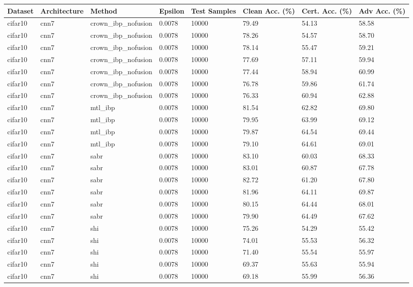 \begin{tabular}{llllllll}\toprule
Dataset & Architecture & Method & Epsilon & Test Samples & Clean Acc. (\%) & Cert. Acc. (\%) & Adv Acc. (\%) \\\midrule
cifar10 & cnn7 & crown\_ibp\_nofusion & 0.0078 & 10000 & 79.49 & 54.13 & 58.58 \\
cifar10 & cnn7 & crown\_ibp\_nofusion & 0.0078 & 10000 & 78.26 & 54.57 & 58.70 \\
cifar10 & cnn7 & crown\_ibp\_nofusion & 0.0078 & 10000 & 78.14 & 55.47 & 59.21 \\
cifar10 & cnn7 & crown\_ibp\_nofusion & 0.0078 & 10000 & 77.69 & 57.11 & 59.94 \\
cifar10 & cnn7 & crown\_ibp\_nofusion & 0.0078 & 10000 & 77.44 & 58.94 & 60.99 \\
cifar10 & cnn7 & crown\_ibp\_nofusion & 0.0078 & 10000 & 76.78 & 59.86 & 61.74 \\
cifar10 & cnn7 & crown\_ibp\_nofusion & 0.0078 & 10000 & 76.33 & 60.94 & 62.88 \\
cifar10 & cnn7 & mtl\_ibp & 0.0078 & 10000 & 81.54 & 62.82 & 69.80 \\
cifar10 & cnn7 & mtl\_ibp & 0.0078 & 10000 & 79.95 & 63.99 & 69.12 \\
cifar10 & cnn7 & mtl\_ibp & 0.0078 & 10000 & 79.87 & 64.54 & 69.44 \\
cifar10 & cnn7 & mtl\_ibp & 0.0078 & 10000 & 79.10 & 64.61 & 69.01 \\
cifar10 & cnn7 & sabr & 0.0078 & 10000 & 83.10 & 60.03 & 68.33 \\
cifar10 & cnn7 & sabr & 0.0078 & 10000 & 83.01 & 60.87 & 67.78 \\
cifar10 & cnn7 & sabr & 0.0078 & 10000 & 82.72 & 61.20 & 67.80 \\
cifar10 & cnn7 & sabr & 0.0078 & 10000 & 81.96 & 64.11 & 69.87 \\
cifar10 & cnn7 & sabr & 0.0078 & 10000 & 80.15 & 64.44 & 68.01 \\
cifar10 & cnn7 & sabr & 0.0078 & 10000 & 79.90 & 64.49 & 67.62 \\
cifar10 & cnn7 & shi & 0.0078 & 10000 & 75.26 & 54.29 & 55.42 \\
cifar10 & cnn7 & shi & 0.0078 & 10000 & 74.01 & 55.53 & 56.32 \\
cifar10 & cnn7 & shi & 0.0078 & 10000 & 71.40 & 55.54 & 55.97 \\
cifar10 & cnn7 & shi & 0.0078 & 10000 & 69.37 & 55.63 & 55.94 \\
cifar10 & cnn7 & shi & 0.0078 & 10000 & 69.18 & 55.99 & 56.36 \\

\end{tabular}
